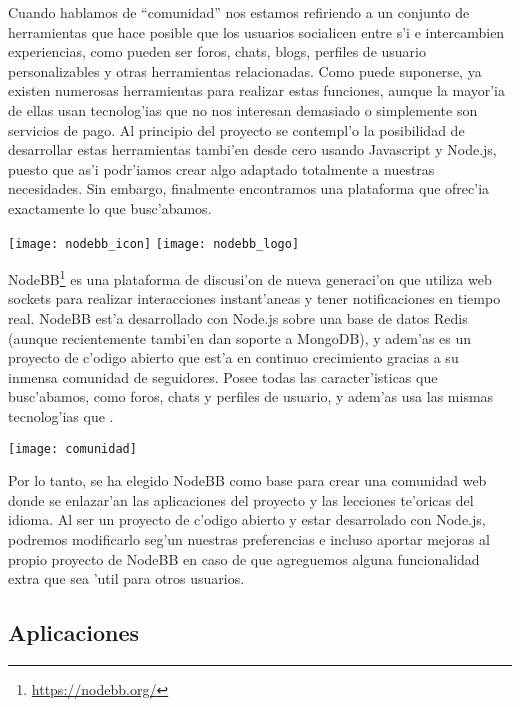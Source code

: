 Cuando hablamos de ``comunidad'' nos estamos refiriendo a un conjunto de herramientas que hace posible que los usuarios
socialicen entre s'i e intercambien experiencias, como pueden ser foros, chats, blogs, perfiles de usuario personalizables
y otras herramientas relacionadas. Como puede suponerse, ya existen numerosas herramientas para realizar estas funciones,
aunque la mayor'ia de ellas usan tecnolog'ias que no nos interesan demasiado o simplemente son servicios de pago.
Al principio del proyecto se contempl'o la posibilidad de desarrollar estas herramientas tambi'en desde cero usando
Javascript y Node.js, puesto que as'i podr'iamos crear algo adaptado totalmente a nuestras necesidades. Sin embargo, finalmente
encontramos una plataforma que ofrec'ia exactamente lo que busc'abamos.

\begin{center}
\texttt{[image: nodebb\_icon]}
\texttt{[image: nodebb\_logo]}
\end{center}

NodeBB\footnote{\url{https://nodebb.org/}} es una plataforma de discusi'on de nueva generaci'on que utiliza web sockets para realizar interacciones
instant'aneas y tener notificaciones en tiempo real. NodeBB est'a desarrollado con Node.js sobre una base de datos
Redis (aunque recientemente tambi'en dan soporte a MongoDB), y adem'as es un proyecto de c'odigo abierto que est'a
en continuo crecimiento gracias a su inmensa comunidad de seguidores. Posee todas las caracter'isticas que busc'abamos,
como foros, chats y perfiles de usuario, y adem'as usa las mismas tecnolog'ias que \Nipponline{}.

\begin{center}
\texttt{[image: comunidad]}
\end{center}

Por lo tanto, se ha elegido NodeBB como base para crear una comunidad web donde se enlazar'an las aplicaciones del proyecto
y las lecciones te'oricas del idioma. Al ser un proyecto de c'odigo abierto y estar desarrolado con Node.js, podremos modificarlo
seg'un nuestras preferencias e incluso aportar mejoras al propio proyecto de NodeBB en caso de que agreguemos alguna funcionalidad
extra que sea 'util para otros usuarios.


\subsection{Aplicaciones}
\label{sec:aplicaciones}

